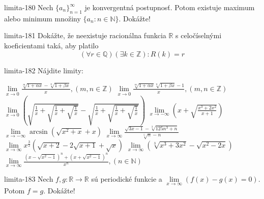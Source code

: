 \begin{defproblem}{limita-180}
Nech ${\{a_n\}}_{n=1}^\infty$ je konvergentná postupnosť. Potom existuje maximum alebo minimum množiny $\{a_n: n \in \mathbb{N}\}$. Dokážte!
\end{defproblem}

\begin{defproblem}{limita-181}
Dokážte, že neexistuje racionálna funkcia $\mathbb{R}$ s celočíselnými
koeficientami taká, aby platilo
\[
    (\forall r \in \mathbb{Q})
        (\exists k \in \mathbb{Z}):
            R(k)=r
\]
\end{defproblem}

\begin{defproblem}{limita-182}
Nájdite limity:
\begin{tasks}
\task $\lim\limits_{x \rightarrow 0} \frac{\sqrt[m]{1+\alpha x}-\sqrt[n]{1+\beta x}}{x},(m,n \in \mathbb{Z})$
\task $\lim\limits_{x \rightarrow 0}  \frac{\sqrt[m]{1+\alpha x}\sqrt[n]{1+\beta x}-1}{x},(m,n \in \mathbb{Z})$
\task $\lim\limits_{x \rightarrow 0} (\sqrt{\frac{1}{x}+\sqrt{\frac{1}{x}+\sqrt{\frac{1}{x}}}}-\sqrt{\frac{1}{x}+\sqrt{\frac{1}{x}+\sqrt{\frac{1}{x}}}})$
\task $\lim\limits_{x \rightarrow -\infty} (x+\sqrt{\frac{x^3+2x^2}{x+1}})$
\task $\lim\limits_{x \rightarrow -\infty} \arcsin (\sqrt{x^2+x}+x)$
\task $\lim\limits_{x \rightarrow \infty} \frac{\sqrt{3x-1}-\sqrt[3]{125n^3+n}}{\sqrt[5]{n}-n}$
\task $\lim\limits_{x \rightarrow \infty} x^{\frac{3}{2}}(\sqrt{x+2}-2\sqrt{x+1}+\sqrt{x})$
\task $\lim\limits_{x \rightarrow \infty} (\sqrt[3]{x^3+3x^2}-\sqrt{x^2-2x})$
\task $\lim\limits_{x \rightarrow \infty} \frac{(x-\sqrt{x^2-1})^n+(x+\sqrt{x^2-1})^n}{x^n}, (n \in \mathbb{N})$
\end{tasks}
\end{defproblem}

\begin{defproblem}{limita-183}
Nech $f,g: \mathbb{R} \rightarrow \mathbb{R}$ sú periodické funkcie a $\lim\limits_{x \rightarrow \infty} (f(x)-g(x)=0)$. Potom $f=g$. Dokážte!
\end{defproblem}

